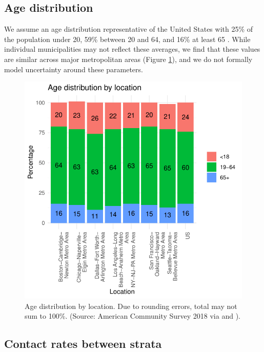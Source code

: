 \documentclass[12pt]{article}
\begin{document}
\subsection{Age distribution}

We assume an age distribution representative of the United States with 25\% of the population under 20, 59\% between 20 and 64, and 16\% at least 65 \citep{censusbureau}.  While individual municipalities may not reflect these averages, we find that these values are similar across major metropolitan areas (Figure \ref{fig:age.dist}), and we do not formally model uncertainty around these parameters.

\begin{figure}[H]
    \centering
    \includegraphics{dem.pdf}
    \caption{Age distribution by location.  Due to rounding errors, total may not sum to 100\%.  (Source: American Community Survey 2018 via \citet{noauthor_population_2019} and \citet{noauthor_census_2020}).}
    \label{fig:age.dist}
\end{figure}

\subsection{Contact rates between strata}
\end{document}
